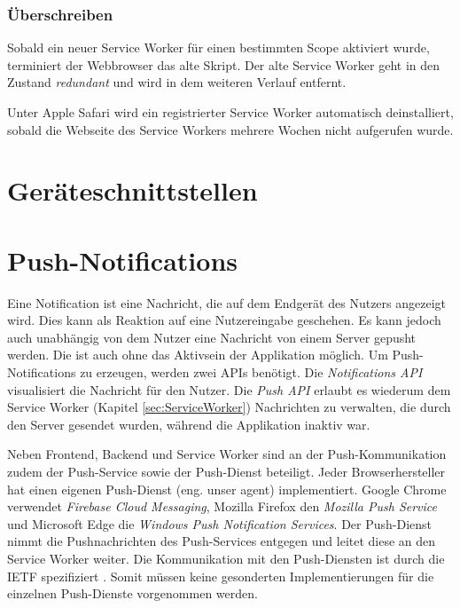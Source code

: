 \subsubsection{Überschreiben}

Sobald ein neuer Service Worker für einen bestimmten Scope aktiviert wurde, terminiert der Webbrowser das alte Skript. Der alte Service Worker geht in den Zustand \textit{redundant} und wird in dem weiteren Verlauf entfernt. 

Unter Apple Safari wird ein registrierter Service Worker automatisch deinstalliert, sobald die Webseite des Service Workers mehrere Wochen nicht aufgerufen wurde. 



\section{Geräteschnittstellen}\label{sec:Geraeteschnittstelle}

\section{Push-Notifications}\label{sec:ThPushNotifikations}

Eine Notification ist eine Nachricht, die auf dem Endgerät des Nutzers angezeigt wird. Dies kann als Reaktion auf eine Nutzereingabe geschehen. Es kann jedoch auch unabhängig von dem Nutzer eine Nachricht von einem Server \glqq gepusht\grqq{} werden. Die ist auch ohne das Aktivsein der Applikation möglich.  Um Push-Notifications zu erzeugen, werden zwei APIs benötigt. Die \textit{Notifications API} visualisiert die Nachricht für den Nutzer. Die \textit{Push API} erlaubt es wiederum dem Service Worker (Kapitel \ref{sec:ServiceWorker}) Nachrichten zu verwalten, die durch den Server gesendet wurden, während die Applikation inaktiv war. 

Neben Frontend, Backend und Service Worker sind an der Push-Kommunikation zudem der Push-Service sowie der Push-Dienst beteiligt. Jeder Browserhersteller hat einen eigenen Push-Dienst (eng. unser agent) implementiert. Google Chrome verwendet \textit{Firebase Cloud Messaging}, Mozilla Firefox den \textit{Mozilla Push Service} und Microsoft Edge die \textit{Windows Push Notification Services}. Der Push-Dienst nimmt die Pushnachrichten des Push-Services entgegen und leitet diese an den Service Worker weiter. Die Kommunikation mit den Push-Diensten ist durch die \ac{IETF} spezifiziert \cite{rfc8030}. Somit müssen keine gesonderten Implementierungen für die einzelnen Push-Dienste vorgenommen werden. 

